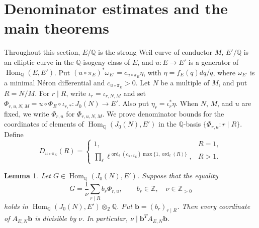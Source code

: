 \documentclass[12pt, letterpaper]{amsart}
\newtheorem{lemma}[theorem]{Lemma}
\theoremstyle{definition}
\theoremstyle{remark}
\newcommand{\Q}{\mathbb Q}
\newcommand{\Z}{\mathbb Z}
\newcommand{\Hom}{\operatorname{Hom}}
\DeclareMathOperator{\ord}{ord}
\numberwithin{equation}{section}
\begin{document}
\section{Denominator estimates and the main theorems}
\label{sec:denominators}

Throughout this section, \(E/\Q\) is the strong Weil curve of conductor \(M\),
\(E'/\Q\) is an elliptic curve in the \(\Q\)-isogeny class of \(E\), and
\(u:E\to E'\) is a generator of \(\Hom_\Q(E,E')\). Put
\((u\circ\pi_E)^*\omega_{E'}=c_{u\circ\pi_E}\eta\), with
\(\eta=f_E(q)dq/q\), where \(\omega_{E'}\) is a minimal N\'eron differential
and \(c_{u\circ\pi_E}>0\). Let
\(N\) be a multiple of \(M\), and put \(R=N/M\). For \(r\mid R\), write
\(\iota_r=\iota_{r,N,M}\) and set
\(\Phi_{r,u,N,M}=u\circ\Phi_E\circ\iota_{r,*}:J_0(N)\to E'\).
Also put \(\eta_r=\iota_r^{*}\eta\).
When \(N\), \(M\), and \(u\) are fixed, we write \(\Phi_{r,u}\) for
\(\Phi_{r,u,N,M}\). We prove denominator bounds for the coordinates of elements
of \(\Hom_\Q(J_0(N),E')\) in the \(\Q\)-basis
\(\{\Phi_{r,u}:r\mid R\}\). Define
\begin{equation}\label{eq:D-factor}
        D_{u\circ\pi_E}(R)=
        \begin{cases}
        1, & R=1,\\[3pt]
        \displaystyle
        \prod_{\ell}\ell^{\ord_\ell(c_{u\circ\pi_E})\max\{1,\ord_\ell(R)\}},
        & R>1.
        \end{cases}
\end{equation}

\begin{lemma}\label{lem:first-n}
Let \(G\in\Hom_\Q(J_0(N),E')\). Suppose that the equality
\[
        G=\frac{1}{\nu}\sum_{r\mid R}b_r\Phi_{r,u},
        \qquad b_r\in\Z,\quad \nu\in\Z_{>0}
\]
holds in \(\Hom_\Q(J_0(N),E')\otimes_\Z\Q\).
Put \(\boldsymbol{b}=(b_r)_{r\mid R}\). Then every coordinate of
\(A_{E,N}\boldsymbol{b}\) is divisible by \(\nu\). In particular,
\(\nu\mid \boldsymbol{b}^{T} A_{E,N}\boldsymbol{b}\).
\end{lemma}
\end{document}
